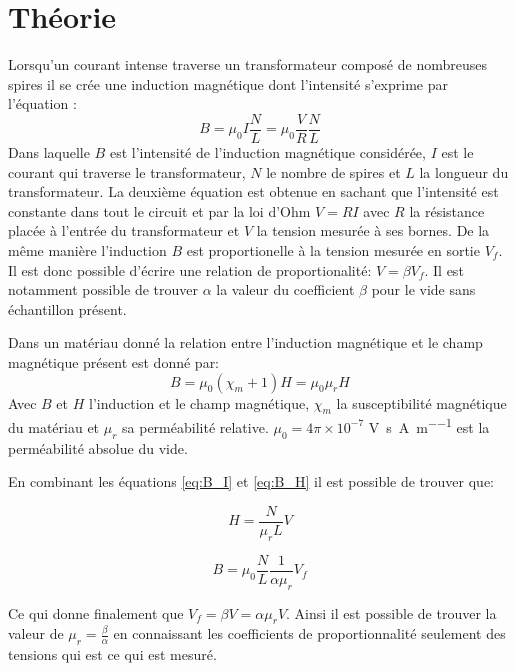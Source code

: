 \section{Théorie}

Lorsqu'un courant intense traverse un transformateur composé de nombreuses spires il se crée une induction magnétique dont l'intensité s'exprime par l'équation \cite{assistant}:
\begin{equation}
    B = \mu_0 I \frac{N}{L} = \mu_0 \frac{V}{R} \frac{N}{L}
    \label{eq:B_I}
\end{equation}
Dans laquelle \(B\) est l'intensité de l'induction magnétique considérée, \(I\) est le courant qui traverse le transformateur, \(N\) le nombre de spires et \(L\) la longueur du transformateur. La deuxième équation est obtenue en sachant que l'intensité est constante dans tout le circuit et par la loi d'Ohm \(V = RI\) avec \(R\) la résistance placée à l'entrée du transformateur et \(V\) la tension mesurée à ses bornes.
De la même manière l'induction \(B\) est proportionelle à la tension mesurée en sortie \(V_f\). Il est donc possible d'écrire une relation de proportionalité: \(V = \beta V_f\). Il est notamment possible de trouver \(\alpha\) la valeur du coefficient \(\beta\) pour le vide sans échantillon présent.

Dans un matériau donné la relation entre l'induction magnétique et le champ magnétique présent est donné par:
\begin{equation}
    B = \mu_0 (\chi_m + 1) H = \mu_0 \mu_r H
    \label{eq:B_H}
\end{equation}
Avec \(B\) et \(H\) l'induction et le champ magnétique, \(\chi_m\) la susceptibilité magnétique du matériau et \(\mu_r\) sa perméabilité relative. \(\mu_0 = 4\pi \times 10^{-7}\) \si{\volt\second \per\ampere\per\meter} est la perméabilité absolue du vide.


En combinant les équations \autoref{eq:B_I} et \autoref{eq:B_H} il est possible de trouver que:

\begin{equation}
    H = \frac{N}{\mu_r L} V
    \label{eq:calibr_H}
\end{equation}

\begin{equation}
    B = \mu_0 \frac{N}{L} \frac{1}{\alpha \mu_r} V_f
    \label{eq:calibr_B}
\end{equation}

Ce qui donne finalement que \(V_f = \beta V = \alpha \mu_r V\). Ainsi il est possible de trouver la valeur de \(\mu_r = \frac{\beta}{\alpha}\) en connaissant les coefficients de proportionnalité seulement des tensions qui est ce qui est mesuré.


